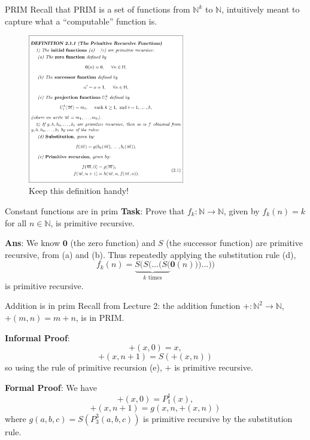 \documentclass{beamer}
\newcommand{\N}{\mathbb N}
\begin{document}
\begin{frame}{PRIM}
Recall that PRIM is a set of functions from $\N^k$ to $\N$, intuitively meant to capture what a ``computable'' function is.

\begin{figure}
    \centering
    \includegraphics[height=6.5cm]{img/prim_def.png}
    \caption*{Keep this definition handy!}
\end{figure}
\end{frame}

\begin{frame}{Constant functions are in prim}
\textbf{Task}: Prove that $f_k: \N \to \N$, given by $f_k(n) = k$ for all $n \in \N$, is primitive recursive. \pause

\textbf{Ans}: We know $\mathbf 0$ (the zero function) and $S$ (the successor function) are primitive recursive, from (a) and (b). Thus repeatedly applying the substitution rule (d),
$$f_k(n) = \underbrace{S(S(\ldots(S(}_{\text{$k$ times}}\mathbf 0(n)))\ldots))$$
is primitive recursive.
\end{frame}

\begin{frame}{Addition is in prim}
Recall from Lecture 2: the addition function $+: \N^2 \to \N$, $+(m, n) = m + n$, is in PRIM.

\pause

\textbf{Informal Proof}:
$$+(x, 0) = x,$$
$$+(x, n + 1) = S(+(x, n))$$
so using the rule of primitive recursion (e), $+$ is primitive recursive.

\pause

\textbf{Formal Proof}:
We have
$$+(x, 0) = P_1^1(x),$$
$$+(x, n + 1) = g(x, n, +(x, n))$$
where $g(a, b, c) = S(P_3^3(a, b, c))$ is primitive recursive by the substitution rule.
\end{frame}
\end{document}
